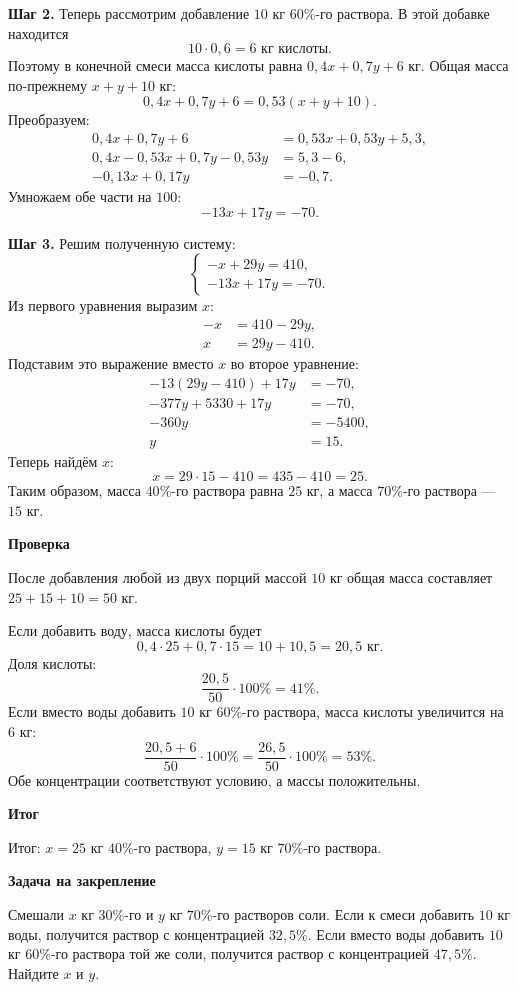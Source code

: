 \documentclass[12pt,a4paper]{article}
\newcommand{\subblock}[1]{\vspace{4pt}\noindent\textbf{#1}\par}
\begin{document}
\textbf{Шаг 2.} Теперь рассмотрим добавление $10$ кг $60\%$-го раствора.
В этой добавке находится
\[
10\cdot 0{,}6=6\text{ кг кислоты}.
\]
Поэтому в конечной смеси масса кислоты равна
$0{,}4x+0{,}7y+6$ кг. Общая масса по-прежнему $x+y+10$ кг:
\[
0{,}4x+0{,}7y+6=0{,}53(x+y+10).
\]
Преобразуем:
\begin{align*}
0{,}4x+0{,}7y+6&=0{,}53x+0{,}53y+5{,}3,\\
0{,}4x-0{,}53x+0{,}7y-0{,}53y&=5{,}3-6,\\
-0{,}13x+0{,}17y&=-0{,}7.
\end{align*}
Умножаем обе части на $100$:
\[
\boxed{-13x+17y=-70.} \tag{2}
\]

\textbf{Шаг 3.} Решим полученную систему:
\[
\begin{cases}
-x+29y=410,\\
-13x+17y=-70.
\end{cases}
\]
Из первого уравнения выразим $x$:
\begin{align*}
-x&=410-29y,\\
x&=29y-410.
\end{align*}
Подставим это выражение вместо $x$ во второе уравнение:
\begin{align*}
-13(29y-410)+17y&=-70,\\
-377y+5330+17y&=-70,\\
-360y&=-5400,\\
y&=15.
\end{align*}
Теперь найдём $x$:
\[
x=29\cdot 15-410=435-410=25.
\]
Таким образом, масса $40\%$-го раствора равна $25$ кг,
а масса $70\%$-го раствора --- $15$ кг.

\subblock{Проверка}
После добавления любой из двух порций массой $10$ кг общая масса
составляет $25+15+10=50$ кг.

Если добавить воду, масса кислоты будет
\[
0{,}4\cdot25+0{,}7\cdot15=10+10{,}5=20{,}5\text{ кг}.
\]
Доля кислоты:
\[
\frac{20{,}5}{50}\cdot100\%=41\%.
\]
Если вместо воды добавить $10$ кг $60\%$-го раствора,
масса кислоты увеличится на $6$ кг:
\[
\frac{20{,}5+6}{50}\cdot100\%
=\frac{26{,}5}{50}\cdot100\%=53\%.
\]
Обе концентрации соответствуют условию, а массы положительны.

\subblock{Итог}
\textcolor{teal!60!black}{Итог:} $x=25$ кг $40\%$-го раствора,
$y=15$ кг $70\%$-го раствора.

\subblock{Задача на закрепление}
Смешали $x$ кг $30\%$-го и $y$ кг $70\%$-го растворов соли.
Если к смеси добавить $10$ кг воды, получится раствор с концентрацией
$32{,}5\%$. Если вместо воды добавить $10$ кг $60\%$-го раствора
той же соли, получится раствор с концентрацией $47{,}5\%$.
Найдите $x$ и $y$.
\end{document}
